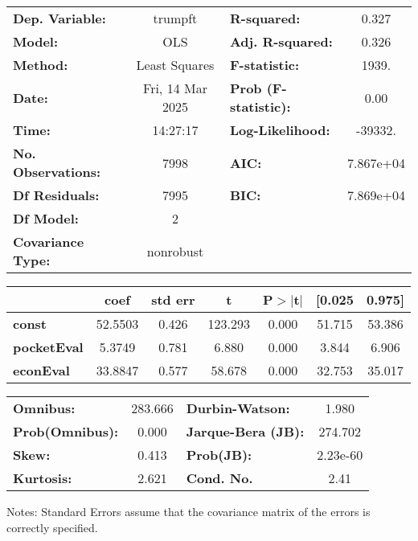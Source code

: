 \begin{center}
\begin{tabular}{lclc}
\toprule
\textbf{Dep. Variable:}    &     trumpft      & \textbf{  R-squared:         } &     0.327   \\
\textbf{Model:}            &       OLS        & \textbf{  Adj. R-squared:    } &     0.326   \\
\textbf{Method:}           &  Least Squares   & \textbf{  F-statistic:       } &     1939.   \\
\textbf{Date:}             & Fri, 14 Mar 2025 & \textbf{  Prob (F-statistic):} &     0.00    \\
\textbf{Time:}             &     14:27:17     & \textbf{  Log-Likelihood:    } &   -39332.   \\
\textbf{No. Observations:} &        7998      & \textbf{  AIC:               } & 7.867e+04   \\
\textbf{Df Residuals:}     &        7995      & \textbf{  BIC:               } & 7.869e+04   \\
\textbf{Df Model:}         &           2      & \textbf{                     } &             \\
\textbf{Covariance Type:}  &    nonrobust     & \textbf{                     } &             \\
\bottomrule
\end{tabular}
\begin{tabular}{lcccccc}
                    & \textbf{coef} & \textbf{std err} & \textbf{t} & \textbf{P$> |$t$|$} & \textbf{[0.025} & \textbf{0.975]}  \\
\midrule
\textbf{const}      &      52.5503  &        0.426     &   123.293  &         0.000        &       51.715    &       53.386     \\
\textbf{pocketEval} &       5.3749  &        0.781     &     6.880  &         0.000        &        3.844    &        6.906     \\
\textbf{econEval}   &      33.8847  &        0.577     &    58.678  &         0.000        &       32.753    &       35.017     \\
\bottomrule
\end{tabular}
\begin{tabular}{lclc}
\textbf{Omnibus:}       & 283.666 & \textbf{  Durbin-Watson:     } &    1.980  \\
\textbf{Prob(Omnibus):} &   0.000 & \textbf{  Jarque-Bera (JB):  } &  274.702  \\
\textbf{Skew:}          &   0.413 & \textbf{  Prob(JB):          } & 2.23e-60  \\
\textbf{Kurtosis:}      &   2.621 & \textbf{  Cond. No.          } &     2.41  \\
\bottomrule
\end{tabular}
\end{center}

Notes: \newline
 [1] Standard Errors assume that the covariance matrix of the errors is correctly specified.